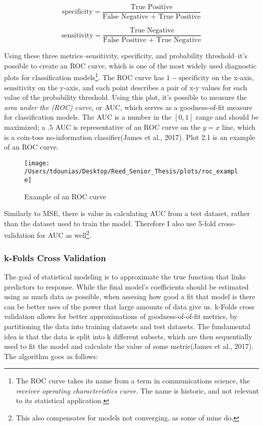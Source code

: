 \documentclass[12pt,twoside]{reedthesis}
\begin{document}
  \[\text{specificity} = \frac{\text{True Positive}}{\text{False Negative + True Positive}}\]
  
  \[\text{sensitivity} = \frac{\text{True Negative}}{\text{False Positive + True Negative}}\]
  
  Using these three metrics--sensitivity, specificity, and probability
  threshold--it's possible to create an ROC curve, which is one of the
  most widely used diagnostic plots for classification models\footnote{The
    ROC curve takes its name from a term in communications science, the
    \emph{receiver operating characteristics curve}. The name is historic,
    and not relevant to its statistical application.}. The ROC curve has
  \(1-\text{specificity}\) on the x-axis, \(\text{sensitivity}\) on the
  y-axis, and each point describes a pair of x-y values for each value of
  the probability threshold. Using this plot, it's possible to measure the
  \emph{area under the (ROC) curve}, or AUC, which serves as a
  goodness-of-fit measure for classification models. The AUC is a number
  in the \([0,1]\) range and should be maximized; a \(.5\) AUC is
  representative of an ROC curve on the \(y = x\) line, which is a
  coin-toss no-information classifier(James et al., 2017). Plot 2.1 is an
  example of an ROC curve.
  
  \begin{figure}
  
  {\centering \texttt{[image: /Users/tdounias/Desktop/Reed\_Senior\_Thesis/plots/roc\_example]} 
  
  }
  
  \caption[Example of an ROC curve]{Example of an ROC curve}\label{fig:roc example}
  \end{figure}
  
  Similarly to MSE, there is value in calculating AUC from a test dataset,
  rather than the dataset used to train the model. Therefore I also use
  5-fold cross-validation for AUC as well\footnote{This also compensates
    for models not converging, as some of mine do.}.
  
  \subsubsection{k-Folds Cross Validation}\label{k-folds-cross-validation}
  
  The goal of statistical modeling is to approximate the true function
  that links predictors to response. While the final model's coefficients
  should be estimated using as much data as possible, when assesing how
  good a fit that model is there can be better uses of the power that
  large amounts of data give us. k-Folds cross validation allows for
  better approximations of goodness-of-of-fit metrics, by partitioning the
  data into training datasets and test datasets. The fundamental idea is
  that the data is split into k different subsets, which are then
  sequentially used to fit the model and calculate the value of some
  metric(James et al., 2017). The algorithm goes as follows:
  
\end{document}

